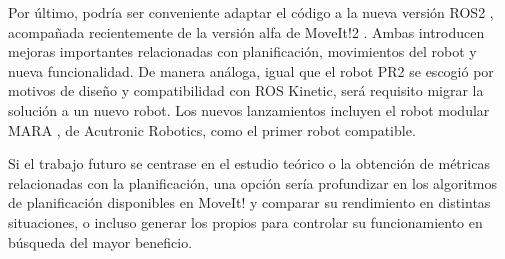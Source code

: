\documentclass[12pt,spanish,chapterprefix, numbers=noenddot]{book}
\numberwithin{equation}{section}
\numberwithin{figure}{section}
\begin{document}
Por último, podría ser conveniente adaptar el código a la nueva versión ROS2 \cite{ros2}, acompañada recientemente de la versión alfa de MoveIt!2 \cite{moveit2}. Ambas introducen mejoras importantes relacionadas con planificación, movimientos del robot y nueva funcionalidad. De manera análoga, igual que el robot PR2 se escogió por motivos de diseño y compatibilidad con ROS Kinetic, será requisito migrar la solución a un nuevo robot. Los nuevos lanzamientos incluyen el robot modular MARA \cite{mara}, de Acutronic Robotics, como el primer robot compatible.

Si el trabajo futuro se centrase en el estudio teórico o la obtención de métricas relacionadas con la planificación, una opción sería profundizar en los algoritmos de planificación disponibles en MoveIt! y comparar su rendimiento en distintas situaciones, o incluso generar los propios para controlar su funcionamiento en búsqueda del mayor beneficio. 

\printbibliography[heading=bibintoc]
\printindex
\end{document}
